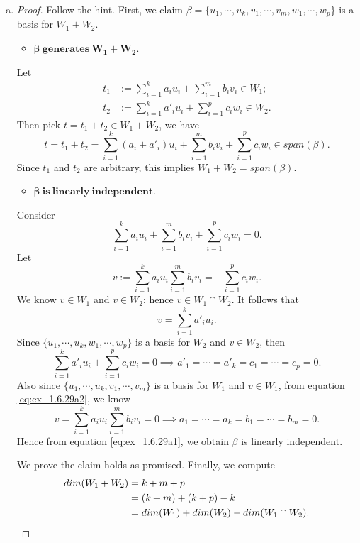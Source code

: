 \begin{Exercise}
\begin{enumerate}[(a)]
\item
\begin{proof}
Follow the hint. First, we claim $\beta = \{u_1,\cdots,u_k,v_1,\cdots,v_m,w_1,\cdots,w_p\}$ is a basis for $W_1+W_2$. 
\begin{itemize}
\item $\mathbf{\boldsymbol{\beta}\ generates\ W_1+W_2}$.
\end{itemize}
Let 
\begin{align*}
t_1 &:= \sum_{i=1}^{k}a_i u_i + \sum_{i=1}^{m}b_i v_i\in W_1; \\
t_2 &:= \sum_{i=1}^{k}a'_i u_i + \sum_{i=1}^{p}c_i w_i\in W_2.
\end{align*}
Then pick $t = t_1+t_2 \in W_1+W_2$, we have 
$$
t = t_1+t_2 = \sum_{i=1}^{k}(a_i+a'_i) u_i + \sum_{i=1}^{m}b_i v_i + \sum_{i=1}^{p}c_i w_i \in span(\beta).
$$
Since $t_1$ and $t_2$ are arbitrary, this implies $W_1+W_2 =  span(\beta)$.

\begin{itemize}
\item $\mathbf{\boldsymbol{\beta}\ is\ linearly\ independent}$.
\end{itemize}
Consider
\begin{equation}\label{eq:ex_1.6.29a1}
\sum_{i=1}^{k}a_i u_i + \sum_{i=1}^{m}b_i v_i + \sum_{i=1}^{p}c_i w_i = 0.
\end{equation}
Let
\begin{equation}\label{eq:ex_1.6.29a2}
v := \sum_{i=1}^{k}a_i u_i \sum_{i=1}^{m}b_i v_i = -\sum_{i=1}^{p}c_i w_i.
\end{equation}
We know $v\in W_1$ and $v\in W_2$; hence $v\in W_1\cap W_2$. It follows that
$$
v = \sum_{i=1}^{k}a'_i u_i.
$$
Since $\{u_1, \cdots, u_k, w_1, \cdots, w_p\}$ is a basis for $W_2$ and $v\in W_2$, then
$$
\sum_{i=1}^{k}a'_i u_i + \sum_{i=1}^{p}c_i w_i = 0
\implies
a'_1 = \cdots = a'_k = c_1 = \cdots = c_p = 0.
$$
Also since $\{u_1, \cdots, u_k, v_1, \cdots, v_m\}$ is a basis for $W_1$ and $v\in W_1$, from equation \eqref{eq:ex_1.6.29a2}, we know
$$
v = \sum_{i=1}^{k}a_i u_i \sum_{i=1}^{m}b_i v_i = 0
\implies
a_1 = \cdots = a_k = b_1 = \cdots = b_m = 0.
$$
Hence from equation \eqref{eq:ex_1.6.29a1}, we obtain $\beta$ is linearly independent.

We prove the claim holds as promised. Finally, we compute
\begin{align}
dim(W_1+W_2) 
&= k+m+p \notag \\
&= (k+m) + (k+p) - k \notag \\
&= dim(W_1) + dim(W_2) - dim(W_1\cap W_2). \label{eq:ex_1.6.29a3}
\end{align}


\end{proof}
\end{enumerate}
\end{Exercise}

